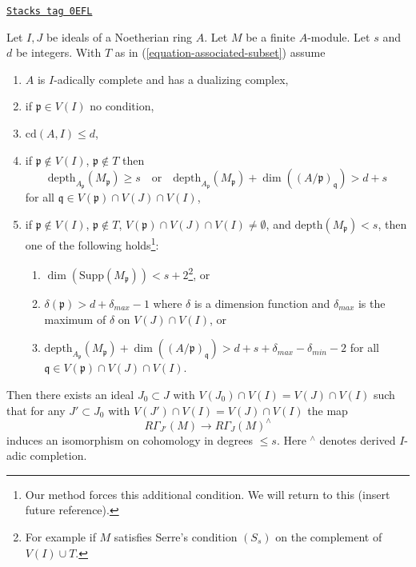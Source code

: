 \begin{lemma}
\label{algebraization-lemma-algebraize-local-cohomology-general}
\href{https://stacks.math.columbia.edu/tag/0EFL}{\texttt{Stacks tag 0EFL}}

Let $I, J$ be ideals of a Noetherian ring $A$.
Let $M$ be a finite $A$-module.
Let $s$ and $d$ be integers. With $T$ as in
(\ref{equation-associated-subset}) assume
\begin{enumerate}
\item $A$ is $I$-adically complete and has a dualizing complex,
\item if $\mathfrak p \in V(I)$ no condition,
\item $\text{cd}(A, I) \leq d$,
\item if $\mathfrak p \not \in V(I)$, $\mathfrak p \not \in T$ then
$$
\text{depth}_{A_\mathfrak p}(M_\mathfrak p) \geq s
\quad\text{or}\quad
\text{depth}_{A_\mathfrak p}(M_\mathfrak p) +
\dim((A/\mathfrak p)_\mathfrak q) > d + s
$$
for all $\mathfrak q \in V(\mathfrak p) \cap V(J) \cap V(I)$,
\item if $\mathfrak p \not \in V(I)$, $\mathfrak p \not \in T$,
$V(\mathfrak p) \cap V(J) \cap V(I) \not = \emptyset$, and
$\text{depth}(M_\mathfrak p) < s$, then one
of the following holds\footnote{Our method
forces this additional condition. We will return to this
(insert future reference).}:
\begin{enumerate}
\item $\dim(\text{Supp}(M_\mathfrak p)) < s + 2$\footnote{For example
if $M$ satisfies Serre's condition $(S_s)$
on the complement of $V(I) \cup T$.}, or
\item  $\delta(\mathfrak p) > d + \delta_{max} - 1$
where $\delta$ is a dimension function and $\delta_{max}$
is the maximum of $\delta$ on $V(J) \cap V(I)$, or
\item $\text{depth}_{A_\mathfrak p}(M_\mathfrak p) +
\dim((A/\mathfrak p)_\mathfrak q) > d + s + \delta_{max} - \delta_{min} - 2$
for all $\mathfrak q \in V(\mathfrak p) \cap V(J) \cap V(I)$.
\end{enumerate}
\end{enumerate}
Then there exists an ideal $J_0 \subset J$ with
$V(J_0) \cap V(I) = V(J) \cap V(I)$
such that for any $J' \subset J_0$ with
$V(J') \cap V(I) = V(J) \cap V(I)$ the map
$$
R\Gamma_{J'}(M) \longrightarrow R\Gamma_J(M)^\wedge
$$
induces an isomorphism on cohomology in degrees $\leq s$.
Here ${}^\wedge$ denotes derived $I$-adic completion.
\end{lemma}

